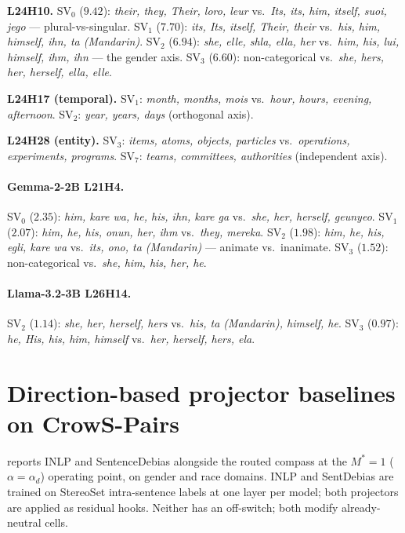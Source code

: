 \textbf{L24H10.} SV$_0$ ($9.42$): \emph{their, they, Their, loro,
leur} vs.\ \emph{Its, its, him, itself, suoi, jego} ---
plural-vs-singular. SV$_1$ ($7.70$): \emph{its, Its, itself,
Their, their} vs.\ \emph{his, him, himself, ihn, ta (Mandarin)}.
SV$_2$ ($6.94$): \emph{she, elle, shla, ella, her} vs.\ \emph{him,
his, lui, himself, ihm, ihn} --- the gender axis. SV$_3$ ($6.60$):
non-categorical vs.\ \emph{she, hers, her, herself, ella, elle}.

\textbf{L24H17 (temporal).} SV$_1$: \emph{month, months, mois}
vs.\ \emph{hour, hours, evening, afternoon}. SV$_2$: \emph{year,
years, days} (orthogonal axis).

\textbf{L24H28 (entity).} SV$_3$: \emph{items, atoms, objects,
particles} vs.\ \emph{operations, experiments, programs}.
SV$_7$: \emph{teams, committees, authorities} (independent axis).

\paragraph{Gemma-2-2B L21H4.}
SV$_0$ ($2.35$): \emph{him, kare wa, he, his, ihn, kare ga} vs.\
\emph{she, her, herself, geunyeo}. SV$_1$ ($2.07$): \emph{him, he,
his, onun, her, ihm} vs.\ \emph{they, mereka}. SV$_2$ ($1.98$):
\emph{him, he, his, egli, kare wa} vs.\ \emph{its, ono, ta
(Mandarin)} --- animate vs.\ inanimate. SV$_3$ ($1.52$):
non-categorical vs.\ \emph{she, him, his, her, he}.

\paragraph{Llama-3.2-3B L26H14.}
SV$_2$ ($1.14$): \emph{she, her, herself, hers} vs.\ \emph{his, ta
(Mandarin), himself, he}. SV$_3$ ($0.97$): \emph{he, His, his, him,
himself} vs.\ \emph{her, herself, hers, ela}.

\section{Direction-based projector baselines on CrowS-Pairs}
\label{app:projector_baselines}

 reports INLP \citep{ravfogel2020inlp} and
SentenceDebias \citep{liang2020sentdebias} alongside the routed
compass at the $M^* = 1$ ($\alpha = \alpha_d$) operating point, on
gender and race domains. INLP and SentDebias are trained on
StereoSet intra-sentence labels at one layer per model; both projectors
are applied as residual hooks. Neither has an off-switch; both modify
already-neutral cells.

